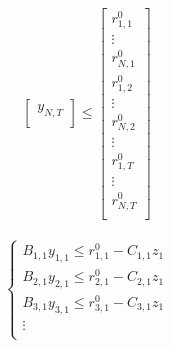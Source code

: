 \documentclass[11pt]{article} %
\begin{document}
\begin{align}
\begin{bmatrix}
        y_{N,T} \\
    \end{bmatrix} \leq
    \begin{bmatrix}
        r_{1,1}^0\\
        \vdots \\
        r_{N,1}^0\\
        r_{1,2}^0\\
        \vdots \\
        r_{N,2}^0\\
        \vdots \\
        r_{1,T}^0\\
        \vdots \\
        r_{N,T}^0\\
    \end{bmatrix}
\end{align}


\begin{align}
    \begin{cases}
         B_{1,1} y_{1,1} \leq r_{1,1}^0 - C_{1,1} z_1\\
         B_{2,1} y_{2,1} \leq r_{2,1}^0 - C_{2,1} z_1\\
         B_{3,1} y_{3,1} \leq r_{3,1}^0 - C_{3,1} z_1\\
        \vdots \\
    \end{cases}
\end{align}
\end{document}
